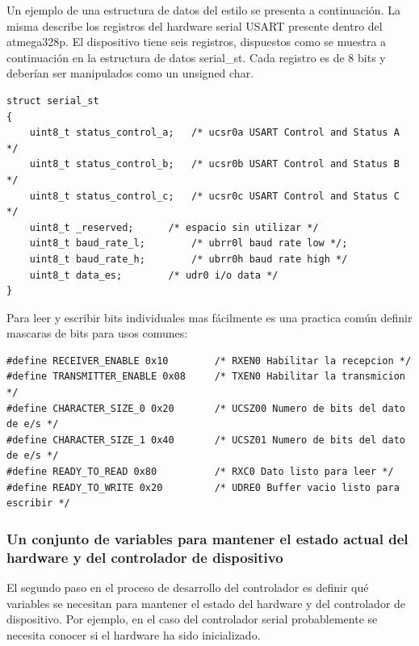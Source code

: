 \documentclass[output=paper, 
colorlinks,
citecolor=brown,
newtxmath
]{langscibook}
\begin{document}
Un ejemplo de una estructura de datos del estilo se presenta a continuación.
La misma describe los registros del hardware serial USART presente dentro
del atmega328p. El dispositivo tiene seis registros, dispuestos como se muestra
a continuación en la estructura de datos serial\_st. Cada registro es de 
8 bits y deberían ser manipulados como un unsigned char.

\begin{small}
\begin{verbatim}
struct serial_st
{
    uint8_t status_control_a;   /* ucsr0a USART Control and Status A */
    uint8_t status_control_b;   /* ucsr0b USART Control and Status B */
    uint8_t status_control_c;   /* ucsr0c USART Control and Status C */
    uint8_t _reserved;    	/* espacio sin utilizar */
    uint8_t baud_rate_l;    	/* ubrr0l baud rate low */;
    uint8_t baud_rate_h;    	/* ubrr0h baud rate high */
    uint8_t data_es;		/* udr0 i/o data */
}
\end{verbatim}
\end{small}


Para leer y escribir bits individuales mas fácilmente es una practica común
definir mascaras de bits para usos comunes:

\begin{small}
\begin{verbatim}
#define RECEIVER_ENABLE 0x10        /* RXEN0 Habilitar la recepcion */
#define TRANSMITTER_ENABLE 0x08     /* TXEN0 Habilitar la transmicion */
#define CHARACTER_SIZE_0 0x20       /* UCSZ00 Numero de bits del dato de e/s */
#define CHARACTER_SIZE_1 0x40       /* UCSZ01 Numero de bits del dato de e/s */
#define READY_TO_READ 0x80          /* RXC0 Dato listo para leer */
#define READY_TO_WRITE 0x20         /* UDRE0 Buffer vacio listo para escribir */
\end{verbatim}
\end{small}


\subsubsection*{Un conjunto de variables para mantener el estado actual del hardware
y del controlador de dispositivo}

El segundo paso en el proceso de desarrollo del controlador es definir
qué variables se necesitan para mantener el estado del hardware y 
del controlador de dispositivo. Por ejemplo, en el caso del controlador 
serial probablemente se necesita conocer si el
hardware ha sido inicializado.
\end{document}
